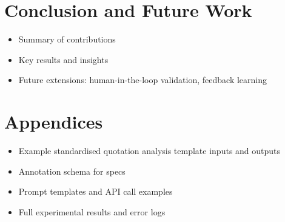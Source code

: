 \documentclass[11pt]{article}
\begin{document}
\section{Conclusion and Future Work}
\begin{itemize}
  \item Summary of contributions
  \item Key results and insights
  \item Future extensions: human-in-the-loop validation, feedback learning
\end{itemize}

\appendix
\section*{Appendices}
\begin{itemize}
  \item Example standardised quotation analysis template inputs and outputs
  \item Annotation schema for specs
  \item Prompt templates and API call examples
  \item Full experimental results and error logs
\end{itemize}
\end{document}
